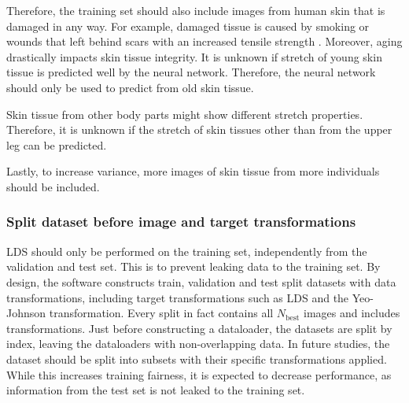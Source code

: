 Therefore, the training set should also include images from human skin that is damaged in any way.
For example, damaged tissue is caused by smoking  or wounds that left behind scars with an increased tensile strength .
Moreover, aging drastically impacts skin tissue integrity.
It is unknown if stretch of young skin tissue is predicted well by the neural network.
Therefore, the neural network should only be used to predict from old skin tissue.

Skin tissue from other body parts might show different stretch properties.
Therefore, it is unknown if the stretch of skin tissues other than from the upper leg can be predicted.

Lastly, to increase variance, more images of skin tissue from more individuals should be included.

\subsubsection{Split dataset before image and target transformations}
LDS should only be performed on the training set, independently from the validation and test set.
This is to prevent leaking data to the training set.
By design, the software constructs train, validation and test split datasets with data transformations, including target transformations such as LDS and the Yeo-Johnson transformation.
Every split in fact contains all $N_\mathrm{best}$ images and includes transformations.
Just before constructing a dataloader, the datasets are split by index, leaving the dataloaders with non-overlapping data.
In future studies, the dataset should be split into subsets with their specific transformations applied.
While this increases training fairness, it is expected to decrease performance, as information from the test set is not leaked to the training set.

